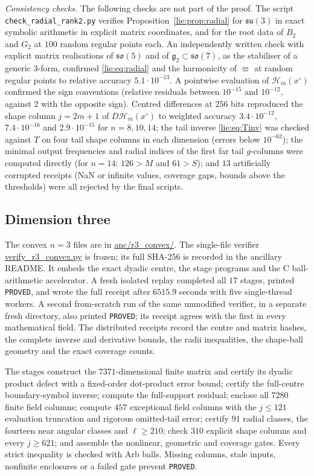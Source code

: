 \documentclass[11pt]{amsart}
\theoremstyle{definition}
\theoremstyle{remark}
\numberwithin{equation}{section}
\newcommand{\Hc}{\mathcal{H}}
\begin{document}
{\sloppy\emph{Consistency checks.} The following checks are not part of the proof. The script \texttt{check\_radial\_rank2.py} verifies Proposition~\ref{lie:prop:radial} for $\mathfrak{su}(3)$ in exact symbolic arithmetic in explicit matrix coordinates, and for the root data of $B_2$ and $G_2$ at $100$ random regular points each. An independently written check with explicit matrix realisations of $\mathfrak{so}(5)$ and of $\mathfrak g_2\subset\mathfrak{so}(7)$, as the stabiliser of a generic $3$-form, confirmed \eqref{lie:eq:radial} and the harmonicity of $\varpi$ at random regular points to relative accuracy $5.1\cdot10^{-13}$. A pointwise evaluation of $\Hc_m(x^\circ)$ confirmed the sign conventions (relative residuals between $10^{-15}$ and $10^{-12}$, against $2$ with the opposite sign). Centred differences at $256$ bits reproduced the shape column $j=2m+1$ of $D\Hc_m(x^\circ)$ to weighted accuracy $3.4\cdot10^{-12}$, $7.4\cdot10^{-16}$ and $2.9\cdot10^{-15}$ for $n=8,10,14$; the tail inverse \eqref{lie:eq:Tinv} was checked against $T$ on four tail shape columns in each dimension (errors below $10^{-62}$); the minimal output frequencies and radial indices of the first far tail $g$-columns were computed directly (for $n=14$: $126>M$ and $61>S$); and $13$ artificially corrupted receipts (NaN or infinite values, coverage gaps, bounds above the thresholds) were all rejected by the final scripts.\par}

\subsection{Dimension three}\label{r3:sec-cap}
The convex $n=3$ files are in \url{anc/r3_convex/}. The single-file verifier \url{verify_r3_convex.py} is frozen; its full SHA-256 is recorded in the ancillary README. It embeds the exact dyadic centre, the stage programs and the C ball-arithmetic accelerator. A fresh isolated replay completed all $17$ stages, printed \texttt{PROVED}, and wrote the full receipt after $6515.9$ seconds with five single-thread workers. A second from-scratch run of the same unmodified verifier, in a separate fresh directory, also printed \texttt{PROVED}; its receipt agrees with the first in every mathematical field. The distributed receipts record the centre and matrix hashes, the complete inverse and derivative bounds, the radii inequalities, the shape-ball geometry and the exact coverage counts.

The stages construct the $7371$-dimensional finite matrix and certify its dyadic product defect with a fixed-order dot-product error bound; certify the full-centre boundary-symbol inverse; compute the full-support residual; enclose all $7280$ finite field columns; compute $457$ exceptional field columns with the $j\leq121$ evaluation truncation and rigorous omitted-tail error; certify $91$ radial classes, the fourteen near angular classes and $\ell\geq210$; check $310$ explicit shape columns and every $j\geq621$; and assemble the nonlinear, geometric and coverage gates. Every strict inequality is checked with Arb balls. Missing columns, stale inputs, nonfinite enclosures or a failed gate prevent \texttt{PROVED}.
\end{document}
